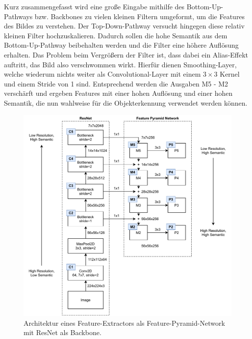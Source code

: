Kurz zusammengefasst wird eine große Eingabe mithilfe des Bottom-Up-Pathways
bzw. Backbones zu vielen kleinen Filtern umgeformt, um die Features des Bildes
zu verstehen. Der Top-Down-Pathway versucht hingegen diese relativ kleinen Filter hochzuskalieren. Dadurch sollen die hohe Semantik aus dem Bottom-Up-Pathway beibehalten werden und die Filter eine höhere Auflösung erhalten. Das Problem beim
Vergrößern der Filter ist, dass dabei ein Alias-Effekt auftritt, das Bild also
verschwommen wirkt. Hierfür dienen Smoothing-Layer, welche wiederum nichts
weiter als Convolutional-Layer mit einem $3 \times 3$ Kernel und einem Stride
von 1 sind. Entsprechend werden die Ausgaben M5 - M2 verschärft und ergeben
Features mit einer hohen Auflösung und einer hohen Semantik, die nun wahlweise
für die Objekterkennung verwendet werden können.

\begin{figure}
    \includegraphics[width=\textwidth]{images/ResNet_FPN.pdf}
    \caption{Architektur eines Feature-Extractors als Feature-Pyramid-Network
    mit ResNet als Backbone.}
    \label{fig:resnet-fpn}
\end{figure}

